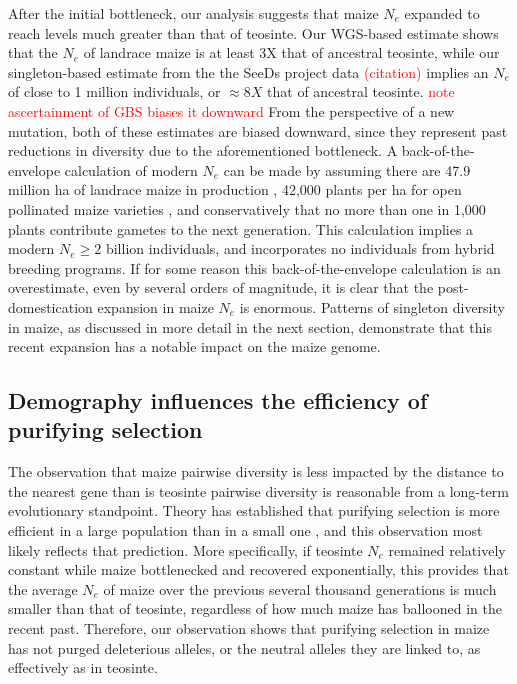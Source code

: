 \documentclass{pnastwo}
\newcommand{\jri}[1]{\textcolor{red}{\scriptsize #1}}
\begin{document}
\begin{article}
After the initial bottleneck, our analysis suggests that maize $N_e$ expanded to reach levels much greater than that of teosinte. Our WGS-based estimate shows that the $N_e$ of landrace maize is at least 3X that of ancestral teosinte, while our singleton-based estimate from the the SeeDs project data \textcolor{red}{(citation)} implies an $N_e$ of close to 1 million individuals, or $\approx 8X$ that of ancestral teosinte. \jri{note ascertainment of GBS biases it downward} From the perspective of a new mutation, both of these estimates are biased downward, since they represent past reductions in diversity due to the aforementioned bottleneck. A back-of-the-envelope calculation of modern $N_e$ can be made by assuming there are 47.9 million ha of landrace maize in production \cite{cimmyt1999}, 42,000 plants per ha for open pollinated maize varieties \cite{van2010}, and conservatively that no more than one in 1,000 plants contribute gametes to the next generation. This calculation implies a modern $N_e \geq  2$ billion individuals, and incorporates no individuals from hybrid breeding programs. If for some reason this back-of-the-envelope calculation is an overestimate, even by several orders of magnitude, it is clear that the post-domestication expansion in maize $N_e$ is enormous. Patterns of singleton diversity in maize, as discussed in more detail in the next section, demonstrate that this recent expansion has a notable impact on the maize genome.


\subsection{Demography influences the efficiency of purifying selection}
The observation that maize pairwise diversity is less impacted by the distance to the nearest gene than is teosinte pairwise diversity is reasonable from a long-term evolutionary standpoint. Theory has established that purifying selection is more efficient in a large population than in a small one \cite{kimura1984}, and this observation most likely reflects that prediction. More specifically, if teosinte $N_e$ remained relatively constant while maize bottlenecked and recovered exponentially, this provides that the average $N_e$ of maize over the previous several thousand generations is much smaller than that of teosinte, regardless of how much maize has ballooned in the recent past. Therefore, our observation shows that purifying selection in maize has not purged deleterious alleles, or the neutral alleles they are linked to, as effectively as in teosinte.


\end{article}
\end{document}
